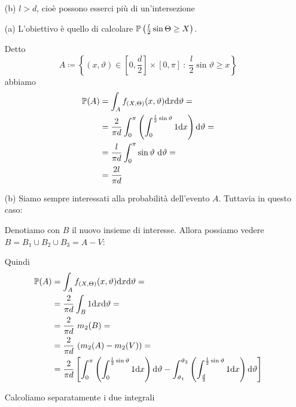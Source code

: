 \begin{enumerate}
\begin{enumerate}
\item [(b)] $l>d$, cioè possono esserci più di un'intersezione

\end{enumerate}

\medskip

\begin{enumerate}

\item [(a)] L'obiettivo è quello di calcolare $\mathbb{P}\left(\frac{l}{2}\sin\Theta\geq X\right)$.

Detto 
\[
A\coloneqq\left\{(x,\vartheta)\in \left[0,\frac{d}{2}\right]\times \left[0,\pi\right]\ :\ \frac{l}{2}\sin\vartheta\geq x  \right\}
\]
abbiamo
\begin{gather*}
\begin{aligned}
\mathbb{P}(A)&=\int_A f_{(X,\Theta)}(x,\vartheta)\mathrm{d} x\text{d}\vartheta=\\
&=\frac{2}{\pi d}\int_0^\pi \left(\int_0^{\frac{l}{2}\sin\vartheta}1\mathrm{d} x   \right)\text{d}\vartheta=\\
&=\frac{l}{\pi d}\int_0^\pi \sin\vartheta\text{ d}\vartheta=\\
&=\frac{2l}{\pi d}
\end{aligned}
\end{gather*}

\item [(b)] Siamo sempre interessati alla probabilità dell'evento $A$. Tuttavia in questo caso:

Denotiamo con $B$ il nuovo insieme di interesse. Allora possiamo vedere $B=B_1\cup B_2\cup B_3=A-V$:

Quindi
\begin{gather}
\begin{aligned}
\label{eqn_7_8}
\mathbb{P}(A)&=\int_A f_{(X,\Theta)}(x,\vartheta)\mathrm{d} x\text{d}\vartheta=\\
&=\frac{2}{\pi d}\int_B 1\mathrm{d} x\text{d}\vartheta=\\
&=\frac{2}{\pi d}\ m_2(B)=\\
&=\frac{2}{\pi d}\ (m_2(A)-m_2(V))=\\
&=\frac{2}{\pi d}\left[\int_0^\pi \left(\int_0^{\frac{l}{2}\sin\vartheta}1\mathrm{d} x \right)\text{d}\vartheta - \int_{\vartheta_1}^{\vartheta_2} \left(\int_{\frac{d}{2}}^{\frac{l}{2}\sin\vartheta}1\mathrm{d} x \right)\text{d}\vartheta  \right]
\end{aligned}
\end{gather}

Calcoliamo separatamente i due integrali


\end{enumerate}
\end{enumerate}
